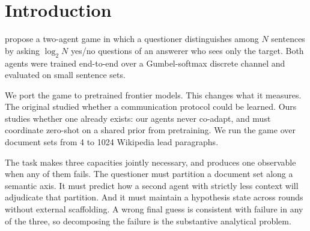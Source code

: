 \documentclass[11pt]{article}
\begin{document}
\begin{abstract}
Information per question, estimated from answer balance, correlates with win
rate at $r=+0.88$. The only two models to extract a full bit per question are
the only two that partition on document titles, a strategy absent below
$N{=}32$ and used in a quarter of questions above it. Reasoning-token
expenditure varies $4.5\times$ across models with little relation to success,
and the trace grows as the candidate set shrinks without a matching gain in
reliability. Cost is uncorrelated with performance at $r=-0.05$: the two
cheapest arms win at \$0.36 and \$0.39 each, against \$2.46 for the most
expensive.

Two China-hosted providers refused documents in our corpus. Moonshot rejected
three of the 1024 paragraphs, on Taiwan's navy, a purged Chinese intellectual
and a detained Hong Kong activist; Z.ai rejected the third of these. We located them by bisection, iteratively
halving the document block and re-submitting until the triggering paragraph was
isolated, and report the refusals as a practical limit on assembled long
contexts. Our per-model ordering inverts published general-intelligence
leaderboards, on which the model finishing last here ranks at or near the top.
\S\ref{sec:external} sets out where independent benchmarks agree with our
result and where they do not.
\end{abstract}

\section{Introduction}

\citet{potash2019} propose a two-agent game in which a questioner distinguishes
among $N$ sentences by asking $\log_2 N$ yes/no questions of an answerer who
sees only the target. Both agents were trained end-to-end over a
Gumbel-softmax discrete channel and evaluated on small sentence sets.

We port the game to pretrained frontier models. This changes what it measures.
The original studied whether a communication protocol could be learned. Ours
studies whether one already exists: our agents never co-adapt, and must
coordinate zero-shot on a shared prior from pretraining. We run the game over
document sets from 4 to 1024 Wikipedia lead paragraphs.

The task makes three capacities jointly necessary, and produces one observable
when any of them fails. The questioner must partition a document set along a
semantic axis. It must predict how a second agent with strictly less context
will adjudicate that partition. And it must maintain a hypothesis state across
rounds without external scaffolding. A wrong final guess is consistent with
failure in any of the three, so decomposing the failure is the substantive
analytical problem.
\end{document}
